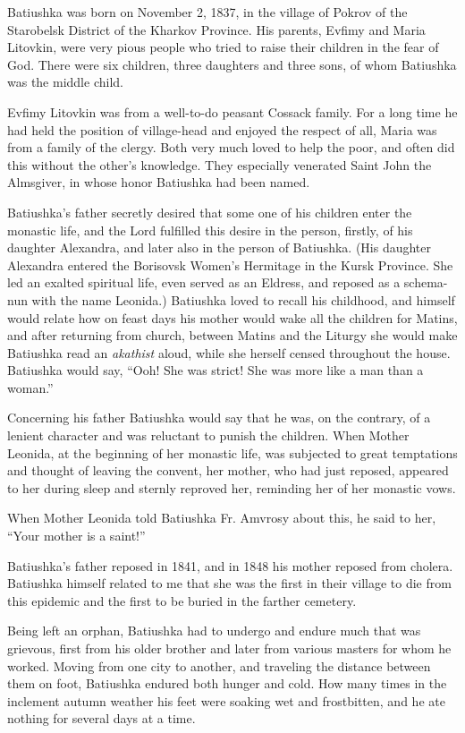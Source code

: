 Batiushka was born on November 2, 1837, in the village of Pokrov of the Starobelsk District of the Kharkov Province. His parents, Evfimy and Maria Litovkin, were very pious people who tried to raise their children in the fear of God. There were six children, three daughters and three sons, of whom Batiushka was the middle child.

Evfimy Litovkin was from a well-to-do peasant Cossack family. For a long time he had held the position of village-head and enjoyed the respect of all, Maria was from a family of the clergy. Both very much loved to help the poor, and often did this without the other's knowledge. They especially venerated Saint John the Almsgiver, in whose honor Batiushka had been named.

Batiushka's father secretly desired that some one of his children enter the monastic life, and the Lord fulfilled this desire in the person, firstly, of his daughter Alexandra, and later also in the person of Batiushka. (His daughter Alexandra entered the Borisovsk Women's Hermitage in the Kursk Province. She led an exalted spiritual life, even served as an Eldress, and reposed as a schema-nun with the name Leonida.) Batiushka loved to recall his childhood, and himself would relate how on feast days his mother would wake all the children for Matins, and after returning from church, between Matins and the Liturgy she would make Batiushka read an \textit{akathist} aloud, while she herself censed throughout the house. Batiushka would say, “Ooh! She was strict! She was more like a man than a woman.”

Concerning his father Batiushka would say that he was, on the contrary, of a lenient character and was reluctant to punish the children. When Mother Leonida, at the beginning of her monastic life, was subjected to great temptations and thought of leaving the convent, her mother, who had just reposed, appeared to her during sleep and sternly reproved her, reminding her of her monastic vows.

When Mother Leonida told Batiushka Fr. Amvrosy about this, he said to her, “Your mother is a saint!”

Batiushka's father reposed in 1841, and in 1848 his mother reposed from cholera. Batiushka himself related to me that she was the first in their village to die from this epidemic and the first to be buried in the farther cemetery.

Being left an orphan, Batiushka had to undergo and endure much that was grievous, first from his older brother and later from various masters for whom he worked. Moving from one city to another, and traveling the distance between them on foot, Batiushka endured both hunger and cold. How many times in the inclement autumn weather his feet were soaking wet and frostbitten, and he ate nothing for several days at a time.

